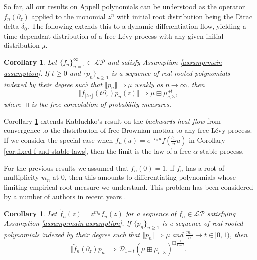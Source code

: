 \documentclass[reqno]{amsart}
\newcommand{\1}{\mathbf{1}}
\newcommand{\LP}{\mathcal{LP}}
\theoremstyle{plain}
\newtheorem{corollary}[theorem]{Corollary}
\theoremstyle{definition}
\theoremstyle{remark}
\numberwithin{equation}{section}
\begin{document}
So far, all our results on Appell polynomials can be understood as the operator $f_n(\partial_z)$ applied to the monomial $z^n$ with initial root distribution being the Dirac delta $\delta_0$. The following extends this to a dynamic differentiation flow, yielding a time-dependent distribution of a free L\'evy process with any given initial distribution $\mu$. 

\begin{corollary}\label{cor:Free convolution theorem}
	Let $\{f_n\}_{n=1}^{\infty}\subset\LP$ and satisfy Assumption \ref{assump:main assumption}. If $t\geq 0$ and $\{p_n\}_{n\geq 1}$ is a sequence of real-rooted polynomials indexed by their degree such that $\llbracket p_n\rrbracket\Rightarrow\mu$ weakly as $n\rightarrow\infty$, then \begin{equation}
		\llbracket f_{\lfloor tn\rfloor}\left(t\partial_{z}\right)p_n(z)\rrbracket\Rightarrow \mu\boxplus\mu_{c,\Sigma}^{\boxplus t},
	\end{equation} where $\boxplus$ is the free convolution of probability measures.
\end{corollary}
 Corollary \ref{cor:Free convolution theorem}  extends Kabluchko's \cite{Kabluchko2022leeyang} result on the \emph{backwards heat flow} from convergence to the distribution of free Brownian motion to any free L\'evy process. If we consider the special case when $f_{n}(u)=e^{-c_nu}f\left(\frac{b_n}{n}u\right)$ in Corollary \ref{cor:fixed f and stable laws}, then the limit is the law of a free $\alpha$-stable process. 

For the previous results we assumed that $f_n(0)=1$. If $f_n$ has a root of multiplicity $m_n$ at $0$, then this amounts to differentiating polynomials whose limiting empirical root measure we understand. This problem has been considered by a number of authors in recent years \cite{Steinerberger2019,Steinerberger2020,Arizmendi-GarzaVargas-Perales2023,Hoskins-Kabluchko2021,Campbell-ORourke-Renfrew2024,Arizmendi-Fujie-Perales-Ueda2024,Hall-Ho-Jalowy-Kabluchko2023Repeat,Arizmendi-Campbell-Fujie2025}.  

\begin{corollary}\label{cor:f with a root at 0} 
	Let $\tilde{f}_n(z)=z^{m_n}f_n(z)$ for a sequence of $f_n\in\LP$ satisfying  Assumption \ref{assump:main assumption}. If $\{p_n\}_{n\geq 1}$ is a sequence of real-rooted polynomials indexed by their degree such that $\llbracket p_n\rrbracket\Rightarrow\mu$ and $\frac{m_n}{n}\rightarrow t\in [0,1)$, then \begin{equation}
		\llbracket \tilde{f}_{n}(\partial_z)p_{n}\rrbracket\Rightarrow\mathcal{D}_{1-t}\left(\mu\boxplus\mu_{c,\Sigma} \right)^{\boxplus\frac{1}{1-t}}.
	\end{equation}
\end{corollary}
\end{document}
